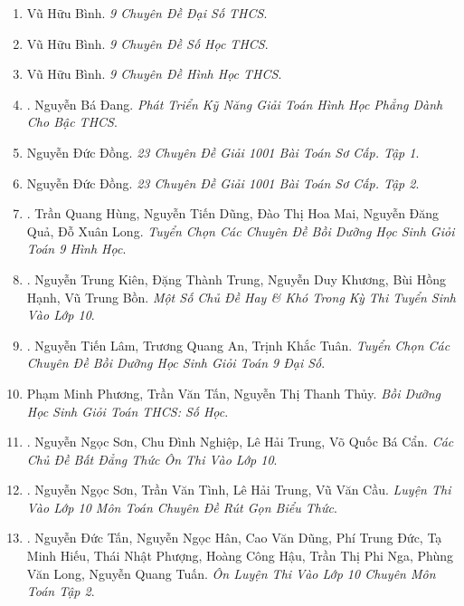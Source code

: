 \documentclass{article}
\begin{document}
\begin{enumerate}
	\item Vũ Hữu Bình. \textit{9 Chuyên Đề Đại Số THCS}.
	\item Vũ Hữu Bình. \textit{9 Chuyên Đề Số Học THCS}.
	\item Vũ Hữu Bình. \textit{9 Chuyên Đề Hình Học THCS}.
	\item \cite{Dang2018}. Nguyễn Bá Đang. \textit{Phát Triển Kỹ Năng Giải Toán Hình Học Phẳng Dành Cho Bậc THCS}.\hfill{\sf[reading]}
	\item Nguyễn Đức Đồng. \textit{23 Chuyên Đề Giải 1001 Bài Toán Sơ Cấp. Tập 1}.\hfill{\sf[reading]}
	\item Nguyễn Đức Đồng. \textit{23 Chuyên Đề Giải 1001 Bài Toán Sơ Cấp. Tập 2}.\hfill{\sf[reading]}
	\item \cite{Hung_Dung_Mai_Qua_Long_Toan_9_hinh_hoc}. Trần Quang Hùng, Nguyễn Tiến Dũng, Đào Thị Hoa Mai, Nguyễn Đăng Quả, Đỗ Xuân Long. \textit{Tuyển Chọn Các Chuyên Đề Bồi Dưỡng Học Sinh Giỏi Toán 9 Hình Học}.\hfill{\sf[reading]}
	\item \cite{Kien_Trung_Khuong_Hanh_Bon}. Nguyễn Trung Kiên, Đặng Thành Trung, Nguyễn Duy Khương, Bùi Hồng Hạnh, Vũ Trung Bồn. \textit{Một Số Chủ Đề Hay \& Khó Trong Kỳ Thi Tuyển Sinh Vào Lớp 10}.\hfill{\sf[reading]}
	\item \cite{Lam_An_Tuan_Toan_9_dai_so}. Nguyễn Tiến Lâm, Trương Quang An, Trịnh Khắc Tuân. \textit{Tuyển Chọn Các Chuyên Đề Bồi Dưỡng Học Sinh Giỏi Toán 9 Đại Số}.\hfill{\sf[reading]}
	\item Phạm Minh Phương, Trần Văn Tấn, Nguyễn Thị Thanh Thủy. \textit{Bồi Dưỡng Học Sinh Giỏi Toán THCS: Số Học}.
	\item \cite{Son_Nghiep_Trung_Can_bdt}. Nguyễn Ngọc Sơn, Chu Đình Nghiệp, Lê Hải Trung, Võ Quốc Bá Cẩn. \textit{Các Chủ Đề Bất Đẳng Thức Ôn Thi Vào Lớp 10}.\hfill{\sf[reading]}
	\item \cite{Son_Tinh_Trung_Cau_rgbt}. Nguyễn Ngọc Sơn, Trần Văn Tình, Lê Hải Trung, Vũ Văn Cầu. \textit{Luyện Thi Vào Lớp 10 Môn Toán Chuyên Đề Rút Gọn Biểu Thức}.\hfill{\sf[reading]}
	\item \cite{Tan_Han_Dung_Duc_Hieu_Phuong_Hau_Nga_Long_Tuan_tap_2}. Nguyễn Đức Tấn, Nguyễn Ngọc Hân, Cao Văn Dũng, Phí Trung Đức, Tạ Minh Hiếu, Thái Nhật Phượng, Hoàng Công Hậu, Trần Thị Phi Nga, Phùng Văn Long, Nguyễn Quang Tuấn. \textit{Ôn Luyện Thi Vào Lớp 10 Chuyên Môn Toán Tập 2}.\\\mbox{}\hfill{\sf[reading]}
\end{enumerate}
\end{document}
